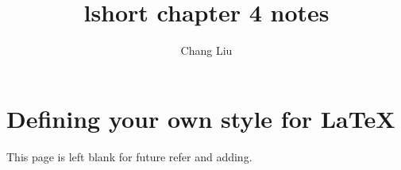 \documentclass{article}
\author{Chang Liu}
\title{lshort chapter 4 notes}
\begin{document}
\maketitle

\newpage

\section{Defining your own style for \LaTeX{}}

This page is left blank for future refer and adding. \newpage

\section{}


\section{}
\end{document}
